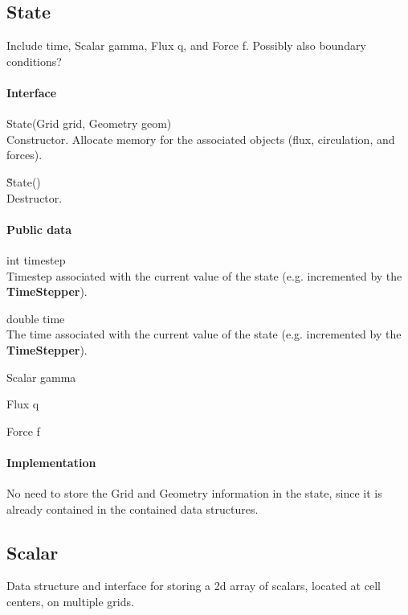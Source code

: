\documentclass[11pt]{article}
\def\class#1{{\bf #1}} %
\begin{document}
\subsection{State}
Include time, Scalar gamma, Flux q, and Force f.  Possibly also boundary conditions?

\paragraph{Interface}
\begin{description}
	\item State(Grid grid, Geometry geom)\\
		Constructor.  Allocate memory for the associated objects (flux, circulation, and forces).
	\item \~State()\\
		Destructor.
\end{description}

\paragraph{Public data}
\begin{description}
	\item int timestep\\
		Timestep associated with the current value of the state (e.g. incremented by the \class{TimeStepper}).
	\item double time\\
		The time associated with the current value of the state (e.g. incremented by the \class{TimeStepper}).
	\item Scalar gamma\\
	\item Flux q\\
	\item Force f
\end{description}

\paragraph{Implementation}
No need to store the Grid and Geometry information in the state, since it is already contained in the contained data structures.

\subsection{Scalar}
Data structure and interface for storing a 2d array of scalars, located at cell centers, on multiple grids.
\end{document}
